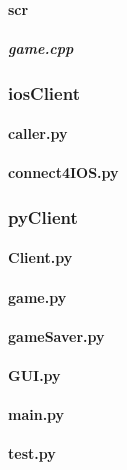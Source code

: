 \documentclass[12pt]{article}
\newcommand{\incFile}[2]{\label{code:#2}\newpage}
\begin{document}
\paragraph{scr}																%
\subparagraph{game.cpp}												\incFile{C++}{Clients/ConsoleClient/scr/game.cpp}
\subsubsection{iosClient}												%
\paragraph{caller.py}														\incFile{python}{Clients/iosClient/caller.py}
\paragraph{connect4IOS.py}											\incFile{python}{Clients/iosClient/connect4IOS.py}
\subsubsection{pyClient}												%
\paragraph{Client.py}														\incFile{python}{Clients/pyClient/Client.py}
\paragraph{game.py}														\incFile{python}{Clients/pyClient/game.py}
\paragraph{gameSaver.py}												\incFile{python}{Clients/pyClient/gameSaver.py}
\paragraph{GUI.py}															\incFile{python}{Clients/pyClient/GUI.py}
\paragraph{main.py}														\incFile{python}{Clients/pyClient/main.py}
\paragraph{test.py}														\incFile{python}{Clients/pyClient/test.py}
\end{document}
